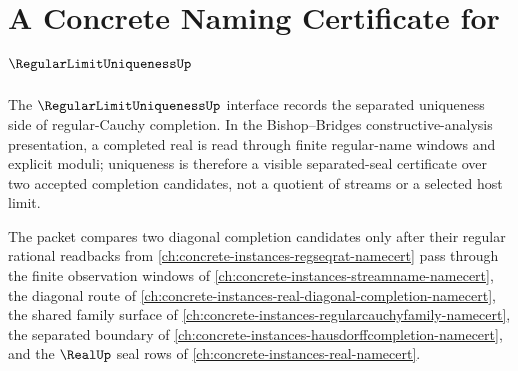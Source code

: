 \chapter{A Concrete Naming Certificate for $\RegularLimitUniquenessUp$}
\label{ch:concrete-instances-regular-limit-uniqueness-namecert}

The $\RegularLimitUniquenessUp$ interface records the separated uniqueness side of regular-Cauchy completion. In the Bishop--Bridges constructive-analysis presentation, a completed real is read through finite regular-name windows and explicit moduli; uniqueness is therefore a visible separated-seal certificate over two accepted completion candidates, not a quotient of streams or a selected host limit.

The packet compares two diagonal completion candidates only after their regular rational readbacks from \autoref{ch:concrete-instances-regseqrat-namecert} pass through the finite observation windows of \autoref{ch:concrete-instances-streamname-namecert}, the diagonal route of \autoref{ch:concrete-instances-real-diagonal-completion-namecert}, the shared family surface of \autoref{ch:concrete-instances-regularcauchyfamily-namecert}, the separated boundary of \autoref{ch:concrete-instances-hausdorffcompletion-namecert}, and the $\RealUp$ seal rows of \autoref{ch:concrete-instances-real-namecert}.

